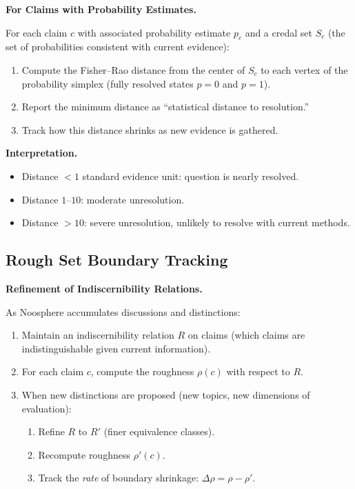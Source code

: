 \documentclass[11pt,letterpaper]{article}
\theoremstyle{definition}
\theoremstyle{remark}
\begin{document}
\textbf{For Claims with Probability Estimates.}

For each claim $c$ with associated probability estimate $p_c$ and a credal set $S_c$ (the set of probabilities consistent with current evidence):

\begin{enumerate}
\item Compute the Fisher--Rao distance from the center of $S_c$ to each vertex of the probability simplex (fully resolved states $p = 0$ and $p = 1$).
\item Report the minimum distance as ``statistical distance to resolution.''
\item Track how this distance shrinks as new evidence is gathered.
\end{enumerate}

\textbf{Interpretation.}
\begin{itemize}
\item Distance $< 1$ standard evidence unit: question is nearly resolved.
\item Distance $1$--$10$: moderate unresolution.
\item Distance $> 10$: severe unresolution, unlikely to resolve with current methods.
\end{itemize}

\subsection{Rough Set Boundary Tracking}

\textbf{Refinement of Indiscernibility Relations.}

As Noosphere accumulates discussions and distinctions:
\begin{enumerate}
\item Maintain an indiscernibility relation $R$ on claims (which claims are indistinguishable given current information).
\item For each claim $c$, compute the roughness $\rho(c)$ with respect to $R$.
\item When new distinctions are proposed (new topics, new dimensions of evaluation):
   \begin{enumerate}
   \item Refine $R$ to $R'$ (finer equivalence classes).
   \item Recompute roughness $\rho'(c)$.
   \item Track the \emph{rate} of boundary shrinkage: $\Delta \rho = \rho - \rho'$.
   \end{enumerate}
\end{enumerate}
\end{document}
